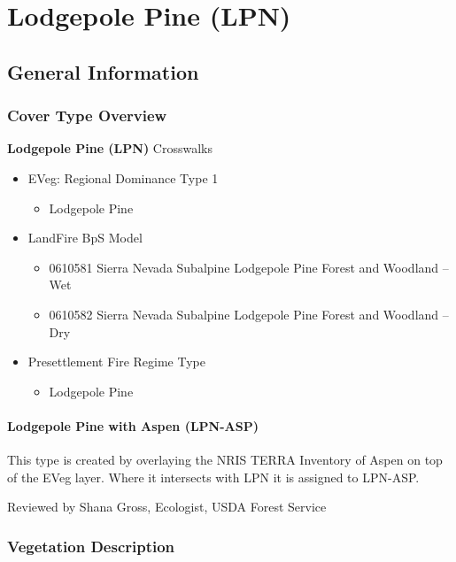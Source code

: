 \newpage
\section{Lodgepole Pine (LPN)}

\subsection*{General Information}

\subsubsection{Cover Type Overview}

\textbf{Lodgepole Pine (LPN)}
\newline
Crosswalks
\begin{itemize}
	\item EVeg: Regional Dominance Type 1
	\begin{itemize}
		\item Lodgepole Pine
	\end{itemize}

	\item LandFire BpS Model
	\begin{itemize}
		\item 0610581 Sierra Nevada Subalpine Lodgepole Pine Forest and Woodland – Wet
		\item 0610582 Sierra Nevada Subalpine Lodgepole Pine Forest and Woodland – Dry

	\end{itemize}

	\item Presettlement Fire Regime Type
	\begin{itemize}
		\item Lodgepole Pine
	\end{itemize}
\end{itemize}

\paragraph{Lodgepole Pine with Aspen (LPN-ASP)}
This type is created by overlaying the NRIS TERRA Inventory of Aspen on top of the EVeg layer. Where it intersects with LPN it is assigned to LPN-ASP.

\noindent Reviewed by Shana Gross, Ecologist, USDA Forest Service

\subsubsection{Vegetation Description}
